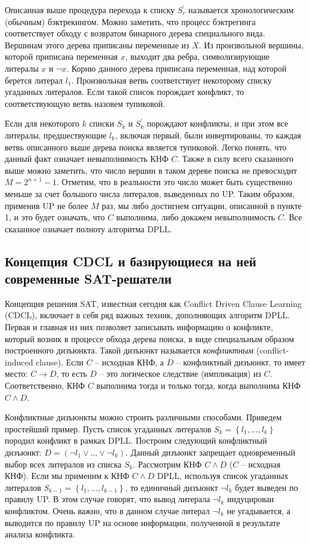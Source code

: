 Описанная выше процедура перехода к списку $S_{r}^{'}$ называется хронологическим (обычным) бэктрекингом. Можно заметить, что процесс бэктрегинга соответствует обходу с возвратом бинарного дерева специального вида. Вершинам этого дерева приписаны переменные из $X$. Из произвольной вершины, которой приписана переменная $x$, выходит два ребра, символизирующие литералы $x$ и $\neg x$. Корню данного дерева приписана переменная, над которой берется литерал $l_{1}$. Произвольная ветвь соответствует некоторому списку угаданных литералов. Если такой список порождает конфликт, то соответствующую ветвь назовем тупиковой.

Если для некоторого $k$ списки $S_{k}$ и $S_{k}^{'}$ порождают конфликты, и при этом все литералы, предшествующие $l_{k}$, включая первый, были инвертированы, то каждая ветвь описанного выше дерева поиска является тупиковой. Легко понять, что данный факт означает невыполнимость КНФ $C$. Также в силу всего сказанного выше можно заметить, что число вершин в таком дереве поиска не превосходит $M = 2^{n + 1} - 1$. Отметим, что в реальности это число может быть существенно меньше за счет большого числа литералов, выведенных по UP. Таким образом, применив UP не более $M$ раз, мы либо достигнем ситуации, описанной в пункте 1, и это будет означать, что $C$ выполнима, либо докажем невыполнимость $C$. Все сказанное означает полноту алгоритма DPLL.

\subsection{Концепция CDCL и базирующиеся на ней современные SAT-решатели}

Концепция решения SAT, известная сегодня как Conflict Driven Clause Learning (CDCL), включает в себя ряд важных техник, дополняющих алгоритм DPLL. Первая и главная из них позволяет записывать информацию о конфликте, который возник в процессе обхода дерева поиска, в виде специальным образом построенного дизъюнкта. Такой дизъюнкт называется \textit{конфликтным} (conflict-induced clause). Если $C$ -- исходная КНФ, а $D$ -- конфликтный дизъюнкт, то имеет место: $C \to D$, то есть $D$ -- это логическое следствие (импликация) из $C$. Соответственно, КНФ $C$ выполнима тогда и только тогда, когда выполнима КНФ $C \land D$.

Конфликтные дизъюнкты можно строить различными способами. Приведем простейший пример. Пусть список угаданных литералов $S_{k} = \left\{ l_{1},\ldots,l_{k} \right\}$ породил конфликт в рамках DPLL. Построим следующий конфликтный дизъюнкт: $D = \left( \neg l_{1} \lor \ldots \lor \neg l_{k} \right)$. Данный дизъюнкт запрещает одновременный выбор всех литералов из списка $S_{k}$. Рассмотрим КНФ $C \land D$ ($C$ -- исходная КНФ). Если мы применим к КНФ $C \land D$ DPLL, используя список угаданных литералов $S_{k - 1} = \left\{ l_{1},\ldots,l_{k - 1} \right\}$, то единичный дизъюнкт $\neg l_{k}$ будет выведен по правилу UP. В этом случае говорят, что вывод литерала $\neg l_{k}$ индуцирован конфликтом. Очень важно, что в данном случае литерал ${\neg l}_{k}$ не угадывается, а выводится по правилу UP на основе информации, полученной в результате анализа конфликта.

